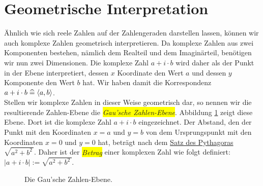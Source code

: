 \section{Geometrische Interpretation}
\"{A}hnlich wie sich reele Zahlen auf der Zahlengeraden darstellen lassen, k\"{o}nnen wir auch komplexe Zahlen
geometrisch interpretieren.  Da komplexe Zahlen aus zwei Komponenten bestehen, n\"{a}mlich dem Realteil und dem Imagin\"{a}rteil, 
ben\"{o}tigen wir nun zwei Dimensionen.  Die komplexe Zahl $a + i \cdot b$ wird daher als der Punkt in der Ebene interpretiert,
dessen $x$ Koordinate den Wert $a$ und dessen $y$ Komponente den Wert $b$ hat.  Wir haben damit die
Korrespondenz 
\\[0.2cm]
\hspace*{1.3cm}
$a + i \cdot b \;\widehat{=}\; \pair(a,b)$.
\\[0.2cm]
Stellen wir komplexe Zahlen in dieser Weise geometrisch dar, so nennen wir die resultierende Zahlen-Ebene
die \colorbox{yellow}{\emph{Gau\3'sche Zahlen-Ebene}}.  Abbildung \ref{fig:gauss-ebene.eps} zeigt diese Ebene.
Dort ist die komplexe Zahl $a + i \cdot b$ eingezeichnet.  Der Abstand, den der Punkt mit den Koordinaten
$x = a$ und $y = b$ von dem Ursprungspunkt mit den Koordinaten $x = 0$ und $y = 0$ hat, betr\"{a}gt nach dem
\href{https://de.wikipedia.org/wiki/Satz_des_Pythagoras}{Satz des Pythagoras} $\sqrt{a^2 + b^2\,}$.  
Daher ist der \colorbox{yellow}{\emph{Betrag}} einer komplexen Zahl wie folgt definiert:
\\[0.2cm]
\hspace*{1.3cm}
$|a + i \cdot b| := \sqrt{a^2 + b^2\,}$.


\begin{figure}[!ht]
  \centering
  \caption{Die Gau\3'sche Zahlen-Ebene.}
  \label{fig:gauss-ebene.eps}
\end{figure}

